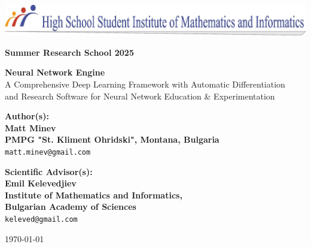 \documentclass[11pt,a4paper]{report}
\begin{document}
\thispagestyle{empty}

\noindent
\includegraphics[width=\textwidth]{uchimi_logo.jpg}

\vspace*{\fill}

\begin{center}

{\Large\textbf{Summer Research School 2025}}

\vspace{1.5em}

{\Huge\textbf{Neural Network Engine}} \\[0.5em]
{\Large A Comprehensive Deep Learning Framework with Automatic Differentiation} \\[0.3em]
{\large and Research Software for Neural Network Education \& Experimentation}

\vspace{2.5em}

{\large
\textbf{Author(s):} \\[1em]
\textbf{Matt Minev}\\
\textbf{PMPG "St. Kliment Ohridski", Montana, Bulgaria}\\
\texttt{matt.minev@gmail.com}
}

\vspace{2.5em}

{\large
\textbf{Scientific Advisor(s):} \\[0.5em]
\textbf{Emil Kelevedjiev}\\
\textbf{Institute of Mathematics and Informatics,} \\
\textbf{Bulgarian Academy of Sciences}\\
\texttt{keleved@gmail.com}
}

\vspace{2.5em}

{\large\today}

\end{center}

\vspace*{\fill}
\end{document}
